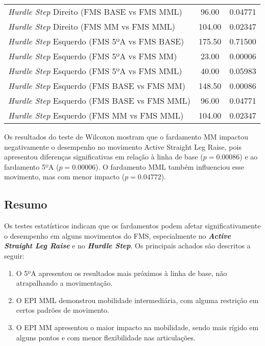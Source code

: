 \begin{table}[H]
\begin{tabular}{lcc}
                \textit{Hurdle Step} Direito (FMS BASE vs FMS MML) & 96.00 & 0.04771 \\
                \textit{Hurdle Step} Direito (FMS MM vs FMS MML) & 104.00 & 0.02347 \\
                \textit{Hurdle Step} Esquerdo (FMS 5ºA vs FMS BASE) & 175.50 & 0.71500 \\
                \textit{Hurdle Step} Esquerdo (FMS 5ºA vs FMS MM) & 23.00 & 0.00006 \\
                \textit{Hurdle Step} Esquerdo (FMS 5ºA vs FMS MML) & 40.00 & 0.05983 \\
                \textit{Hurdle Step} Esquerdo (FMS BASE vs FMS MM) & 148.50 & 0.00086 \\
                \textit{Hurdle Step} Esquerdo (FMS BASE vs FMS MML) & 96.00 & 0.04771 \\
                \textit{Hurdle Step} Esquerdo (FMS MM vs FMS MML) & 104.00 & 0.02347 \\
                \hline
            \end{tabular}
            \end{table}

        Os resultados do teste de Wilcoxon mostram que o fardamento \acrlong{MM} impactou negativamente o desempenho no movimento Active Straight Leg Raise, pois apresentou diferenças significativas em relação à linha de base ($p = 0.00086$) e ao fardamento 5ºA ($p = 0.00006$). O fardamento \acrlong{MML} também influenciou esse movimento, mas com menor impacto ($p = 0.04772$).

    \subsection{Resumo}
        Os testes estatísticos indicam que os fardamentos podem afetar significativamente o desempenho 
        em alguns movimentos do \acrshort{FMS}, especialmente no \textit{\textbf{Active Straight Leg Raise}} e no \textit{\textbf{Hurdle 
        Step}}. Os principais achados são descritos a seguir:
        
        \begin{enumerate}[label=\Roman*.] %
            \item O 5ºA apresentou os resultados mais próximos à linha de base, não atrapalhando a 
            movimentação.
            \item O \acrshort{EPI} \acrlong{MML} demonstrou mobilidade intermediária, com alguma
            restrição em certos padrões de movimento.
            \item O \acrshort{EPI} \acrlong{MM} apresentou o maior impacto na mobilidade, sendo 
            mais rígido em alguns pontos e com menor flexibilidade nas articulações.
            \end{enumerate}

